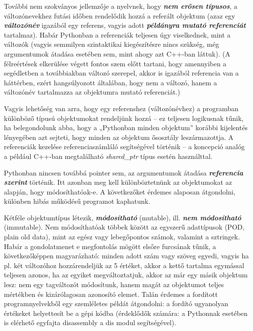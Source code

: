 \documentclass[12pt,a4paper,oneside]{report}             %
\begin{document}
További nem szokványos jellemzője a nyelvnek, hogy \textbf{\textit{nem erősen típusos}}, a változónevekhez futási időben rendelődik hozzá a referált objektum (azaz egy \textbf{\textit{változónév}} igazából egy referens, vagyis adott \textbf{\textit{példányra mutató referenciát}} tartalmaz). Habár Pythonban a referenciák teljesen úgy viselkednek, mint a változók (vagyis semmilyen szintaktikai kiegészítésre nincs szükség, még argumentumok átadása esetében sem, mint ahogy azt C++-ban láttuk). (A félreértések elkerülése végett fontos szem előtt tartani, hogy amennyiben a segédletben a továbbiakban változó szerepel, akkor is igazából referencia van a háttérben, ezért hangsúlyozott általában, hogy nem a változó, hanem a változónév tartalmazza az objektumra mutató referenciát.)

Vagyis lehetőség van arra, hogy egy referenshez (változónévhez) a programban különböző típusú objektumokat rendeljünk hozzá – ez teljesen logikusnak tűnik, ha belegondolunk abba, hogy a „Pythonban minden objektum” korábbi kijelentés lényegében azt sejteti, hogy minden az objektum ősosztály leszármazottja. A referenciák kezelése referenciaszámláló segítségével történik – a koncepció analóg a például C++-ban megtalálható \emph{shared\_ptr} típus esetén használttal.

Pythonban nincsen továbbá pointer sem, az argumentumok átadása \textbf{\textit{referencia szerint}} történik. Itt azonban meg kell különböztetnünk az objektumokat az alapján, hogy módosíthatóak-e. A következőket érdemes alaposan átgondolni, különben hibás működésű programot kaphatunk.

Kétféle objektumtípus létezik, \textbf{\textit{módosítható}} (mutable), ill. \textbf{\textit{nem módosítható}} (immutable). Nem módosíthatóak többek között az egyszerű adattípusok (POD, plain old data), mint az egész vagy lebegőpontos számok, valamint a sztringek. Habár a gondolatmenet e megfontolás mögött elsőre furcsának tűnik, a következőképpen magyarázható: minden adott szám vagy szöveg egyedi, vagyis ha pl. két változóhoz hozzárendeljük az 5 értéket, akkor a kettő tartalma egymással teljesen azonos, ha az egyiket megváltoztatjuk, akkor az már egy másik objektum lesz: nem egy tagváltozót módosítunk, hanem magát az objektumot teljes mértékben és kizárólagosan azonosító elemet. Talán érdemes a fordított programnyelvekből egy szemléletes példát átgondolni: a fordító ugyanolyan értékeket helyettesít be a gépi kódba (érdeklődők számára: a Pythonnak esetében is elérhető egyfajta disassembly a dis modul segítségével).
\end{document}
